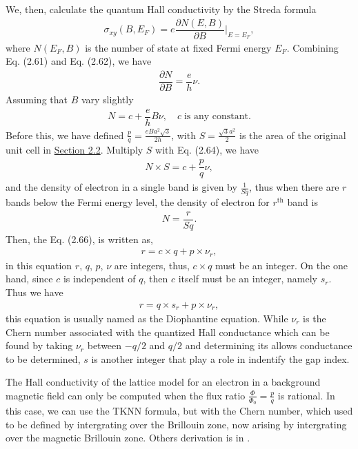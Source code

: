 \documentclass{report}
\newcommand{\f}[2]{\dfrac{#1}{#2}}
\newcommand{\at}[2]{\bigg\rvert_{#1}^{#2} }
\begin{document}

We, then, calculate the quantum Hall conductivity by the Streda formula \cite{streda1982}
\begin{gather}
	\sigma_{xy}(B,E_{F}) = e \f{\partial N (E,B)}{\partial B} \at{E=E_{F}}{},
\end{gather}
where $N(E_{F},B)$ is the number of state at fixed Fermi energy $E_{F}$. Combining Eq. (2.61) and Eq. (2.62), we have
\begin{gather}
	\f{\partial N}{\partial B} = \f{e}{h} \nu.
\end{gather}
Assuming that $B$ vary slightly
\begin{gather}
	N = c + \f{e}{h}B \nu, \quad c \; \text{is any constant}.
\end{gather}
Before this, we have defined $\frac{p}{q} = \frac{eBa^{2}\sqrt{3}}{2h}$, with $S = \frac{\sqrt{3} a^{2}}{2}$ is the area of the original unit cell in \hyperref[Section 2.2]{Section 2.2}. Multiply $S$ with Eq. (2.64), we have
\begin{gather}
	N \times S = c + \f{p}{q} \nu,
\end{gather}
and the density of electron in a single band is given by $\frac{1}{Sq}$, thus when there are $r$ bands below the Fermi energy level, the density of electron for $r^{\text{th}}$ band is
\begin{gather}
	N = \f{r}{Sq}.
\end{gather}
Then, the Eq. (2.66), is written as,
\begin{gather}
	r = c \times q + p \times \nu_{r},
\end{gather}
in this equation $r$, $q$, $p$, $\nu$ are integers, thus, $c\times q$ must be an integer. On the one hand, since $c$ is independent of $q$, then $c$ itself must be an integer, namely $s_{r}$. Thus we have
\begin{gather}
	r = q \times s_{r} + p \times \nu_{r},
\end{gather}
this equation is usually named as the Diophantine equation. While $\nu_{r}$ is the Chern number associated with the quantized Hall conductance which can be found by taking $\nu_{r}$ between $-q/2$ and $q/2$ and determining its allows conductance to be determined, $s$ is another integer that play a role in indentify the gap index.

The Hall conductivity of the lattice model for an electron in a background magnetic field can only be computed when the flux ratio $\frac{\Phi}{\Phi_{0}} = \frac{p}{q}$ is rational. In this case, we can use the TKNN formula, but with the Chern number, which used to be defined by intergrating over the Brillouin zone, now arising by intergrating over the magnetic Brillouin zone. Others derivation is in \cite{di2022linking,dana1985,avron2003}.
\end{document}
